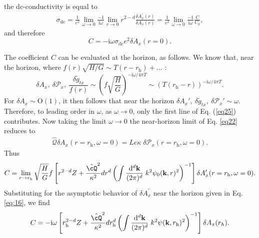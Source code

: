 \documentclass[10pt, oneside]{book}
\begin{document}
\begin{doublespace}
the dc-conductivity is equal to
\begin{align}
  \label{eq:12}
  \sigma_{\mathrm{dc}} = \frac{1}{e^2} \lim_{\omega \rightarrow 0} \frac{-1}{\mathrm{i}\omega} \lim_{r\rightarrow 0}r^{2-d}\frac{ \delta A_x^\prime(r)}{\delta A_x(r)} = \frac{1}{e^2} \lim_{\omega \rightarrow 0} \frac{-1}{\mathrm{i}\omega} \frac{C}{C_0},
\end{align}
and therefore
\begin{equation}
C=-\mathrm{i}\omega \sigma_{\mathrm{dc}} e^2 \delta A_x(r=0).
\end{equation}  


The coefficient $C$ can be evaluated at the horizon, as follows.   We know that, near the horizon, where $f(r) \sqrt{H/G} \sim T(r-r_{\mathrm{h}})+\ldots$ : \begin{equation}
\label{eq:16}
\delta A_x,~ \delta\mathcal{P}_x,~\frac{\delta\tilde{g}_{tx}}{f(r)}\sim \left(f\sqrt{\frac{H}{G}}\right)^{-\mathrm{i}\omega/4\pi T} \sim \left(T(r_{\mathrm{h}}-r)\right)^{-\mathrm{i}\omega/4\pi T}.  
\end{equation}
For $\delta A_x \sim \mathrm{O}(1)$, it then follows that near the horizon $\delta A_x',~\delta\tilde{g}_{tx},~\delta\mathcal{P}_x'\sim \omega$. Therefore, to leading order in $\omega$, as $\omega\rightarrow 0$, only the first line of Eq. (\ref{eq25}) contributes. Now taking the limit $\omega \rightarrow 0$ the near-horizon limit of Eq. \eqref{eq22}  reduces to 
\begin{align}
  \label{eq:13}
  \hat{\mathcal{Q}} \delta A_x(r=r_{\mathrm{h}}, \omega=0) = Le\kappa \; \delta \mathcal{P}_x (r=r_{\mathrm{h}},\omega=0) .
\end{align}
Thus
\begin{align}
  \label{eq:14}
  C = \lim_{r\rightarrow r_{\mathrm{h}}} \sqrt{\frac{H}{G}} f \left[  r^{2-d} Z + \frac{\hat{\cQ}^2}{\kappa^2}dr^d \left(\int \frac{\mathrm{d}^d\mathbf{k}}{(2\pi)^d}\; k^2 \psi_0(\mathbf{k},r)^2\right)^{-1} \right] \delta A_x^\prime(r=r_{\mathrm{h}},\omega=0).
\end{align}
Substituting for the asymptotic behavior of $\delta A_x^\prime$ near the horizon given in Eq. \eqref{eq:16}, we find 
\begin{align}
  \label{eq:17}
  C = -\mathrm{i} \omega \left[  r_{\mathrm{h}}^{2-d} Z + \frac{\hat{\cQ}^2}{\kappa^2}dr_{\mathrm{h}}^d \left(\int \frac{\mathrm{d}^d\mathbf{k}}{(2\pi)^d}\; k^2 \psi(\mathbf{k},r_{\mathrm{h}})^2\right)^{-1} \right] \delta A_x (r_h).
\end{align}
%
%
%

\end{doublespace}
\end{document}
